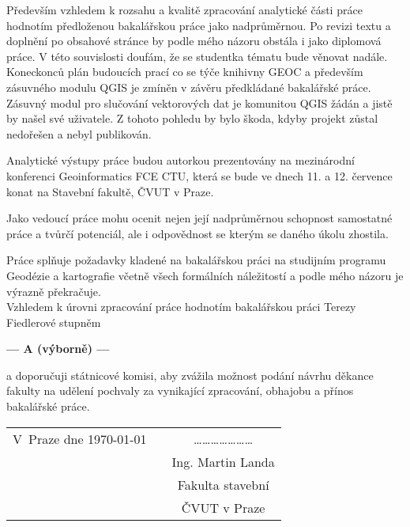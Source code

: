 \documentclass[czech,11pt,a4paper]{article}
\begin{document}
Především vzhledem k rozsahu a kvalitě zpracování analytické části
práce hodnotím předloženou bakalářskou práce jako nadprůměrnou. Po
revizi textu a doplnění po obsahové stránce by podle mého názoru
obstála i jako diplomová práce. V této souvislosti doufám, že se
studentka tématu bude věnovat nadále. Koneckonců plán budoucích prací
co se týče knihivny GEOC a především zásuvného modulu QGIS je zmíněn v
závěru předkládané bakalářské práce. Zásuvný modul pro slučování
vektorových dat je komunitou QGIS žádán a jistě by našel své
uživatele. Z tohoto pohledu by bylo škoda, kdyby projekt zůstal
nedořešen a nebyl publikován. 

Analytické výstupy práce budou autorkou prezentovány na mezinárodní
konferenci Geoinformatics FCE CTU, která se bude ve dnech 11. a
12. července konat na Stavební fakultě, ČVUT v Praze.

Jako vedoucí práce mohu ocenit nejen její nadprůměrnou schopnost
samostatné práce a tvůrčí potenciál, ale i odpovědnost se kterým se
daného úkolu zhostila. 

Práce splňuje požadavky kladené na bakalářskou práci na studijním
programu Geodézie a kartografie včetně všech formálních náležitostí a
podle mého názoru je výrazně překračuje. \\

Vzhledem k úrovni zpracování práce hodnotím bakalářskou práci Terezy
Fiedlerové stupněm

\begin{center}
{\bf --- A (výborně)  ---}
\end{center}

a doporučuji státnicové komisi, aby zvážila možnost podání návrhu
děkance fakulty na udělení pochvaly za vynikající zpracování, obhajobu
a přínos bakalářské práce.

\vspace{2cm}

\begin{tabular}{lp{}c}
V~Praze dne \today & & \ldots\ldots\ldots\ldots\ldots\ldots\ldots \\
& & Ing. Martin Landa \\
& & Fakulta stavební \\
& & ČVUT v Praze \\
\end{tabular}
\end{document}
